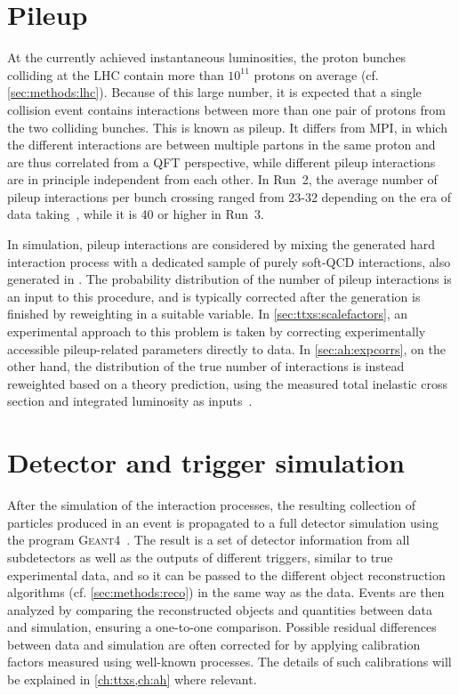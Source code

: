 \section{Pileup}
\label{sec:mc:pileup}

At the currently achieved instantaneous luminosities, the proton bunches colliding at the LHC contain more than $10^{11}$ protons on average (cf. \cref{sec:methods:lhc}). Because of this large number, it is expected that a single collision event contains interactions between more than one pair of protons from the two colliding bunches. This is known as pileup. It differs from MPI, in which the different interactions are between multiple partons in the same proton and are thus correlated from a QFT perspective, while different pileup interactions are in principle independent from each other. In Run~2, the average number of pileup interactions per bunch crossing ranged from 23-32 depending on the era of data taking~\cite{CMS:2020ebo}, while it is 40 or higher in Run~3.

In simulation, pileup interactions are considered by mixing the generated hard interaction process with a dedicated sample of purely soft-QCD interactions, also generated in \pythia. The probability distribution of the number of pileup interactions is an input to this procedure, and is typically corrected after the generation is finished by reweighting in a suitable variable. In \cref{sec:ttxs:scalefactors}, an experimental approach to this problem is taken by correcting experimentally accessible pileup-related parameters directly to data. In \cref{sec:ah:expcorrs}, on the other hand, the distribution of the true number of interactions is instead reweighted based on a theory prediction, using the measured total inelastic cross section and integrated luminosity as inputs~\cite{CMS:LUM-17-003}.

\section{Detector and trigger simulation}
\label{sec:mc:detector}

After the simulation of the interaction processes, the resulting collection of particles produced in an event is propagated to a full detector simulation using the program \textsc{Geant4}~\cite{GEANT4:2002}. 
The result is a set of detector information from all subdetectors as well as the outputs of different triggers, similar to true experimental data, and so it can be passed to the different object reconstruction algorithms (cf. \cref{sec:methods:reco}) in the same way as the data. Events are then analyzed by comparing the reconstructed objects and quantities between data and simulation, ensuring a one-to-one comparison. Possible residual differences between data and simulation are often corrected for by applying calibration factors measured using well-known processes. The details of such calibrations will be explained in \cref{ch:ttxs,ch:ah} where relevant.